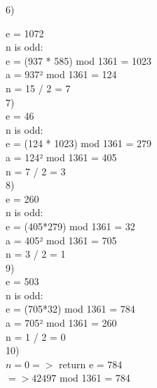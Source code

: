 6)

e = 1072\\
n is odd:\\
e = (937 * 585) mod 1361 = 1023\\
a = 937² mod 1361 = 124\\
n = 15 / 2 = 7\\

7)\\

e = 46\\
n is odd:\\
e = (124 * 1023) mod 1361 = 279\\
a = 124² mod 1361 = 405\\
n = 7 / 2 = 3\\

8)\\

e = 260\\
n is odd:\\
e = (405*279) mod 1361 = 32\\
a = 405² mod 1361 = 705\\
n = 3 / 2 = 1\\

9)\\

e = 503\\
n is odd:\\
e = (705*32) mod 1361 = 784\\
a = 705² mod 1361 = 260\\
n = 1 / 2 = 0\\

10)\\

$n = 0 =>$ return e = 784\\

$=> 42497$ mod 1361 = 784
